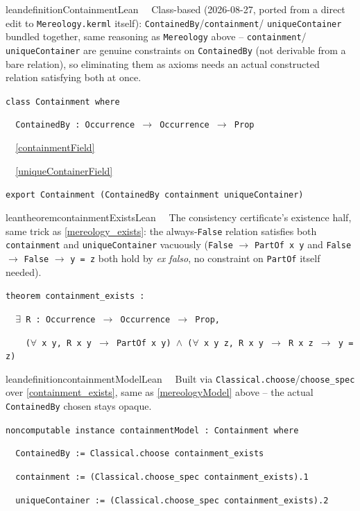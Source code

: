 \begin{restatable}{leandefinition}{ContainmentLean}~~ Class-based (2026-08-27,
ported from a direct edit to \texttt{Mereology.kerml} itself): \texttt{ContainedBy}/\texttt{containment}/
\texttt{uniqueContainer} bundled together, same reasoning as \texttt{Mereology} above -- \texttt{containment}/
\texttt{uniqueContainer} are genuine constraints on \texttt{ContainedBy} (not derivable from a bare relation),
so eliminating them as axioms needs an actual constructed relation satisfying both at once.

\texttt{\textcolor{leancolor}{class} \textcolor{leanyellow}{Containment} \textcolor{leancolor}{where}}

\texttt{~~ContainedBy : Occurrence $\to$ Occurrence $\to$ Prop}

\texttt{~~}\ref{containmentField}

\texttt{~~}\ref{uniqueContainerField}

\texttt{\textcolor{leancolor}{export} Containment (ContainedBy containment uniqueContainer)}
\label{Containment}
\end{restatable}

\begin{restatable}{leantheorem}{containmentExistsLean}~~ The consistency
certificate's existence half, same trick as \ref{mereology_exists}: the always-\texttt{False} relation
satisfies both \texttt{containment} and \texttt{uniqueContainer} vacuously (\texttt{False}
$\to$ \texttt{PartOf x y} and \texttt{False} $\to$ \texttt{False} $\to$ \texttt{y = z} both hold by
\emph{ex falso}, no constraint on \texttt{PartOf} itself needed).

\texttt{\textcolor{leancolor}{theorem} \textcolor{leanyellow}{containment\_exists} :}

\texttt{~~$\exists$ R : Occurrence $\to$ Occurrence $\to$ Prop,}

\texttt{~~~~($\forall$ x y, R x y $\to$ PartOf x y) $\wedge$ ($\forall$ x y z, R x y $\to$ R x z $\to$ y = z)}
\label{containment_exists}
\end{restatable}

\begin{restatable}{leandefinition}{containmentModelLean}~~ Built via
\texttt{Classical.choose}/\texttt{choose\_spec} over \ref{containment_exists}, same as
\ref{mereologyModel} above -- the actual \texttt{ContainedBy} chosen stays opaque.

\texttt{\textcolor{leancolor}{noncomputable instance} \textcolor{leanyellow}{containmentModel} : Containment \textcolor{leancolor}{where}}

\texttt{~~ContainedBy := Classical.choose containment\_exists}

\texttt{~~containment := (Classical.choose\_spec containment\_exists).1}

\texttt{~~uniqueContainer := (Classical.choose\_spec containment\_exists).2}
\label{containmentModel}
\end{restatable}

